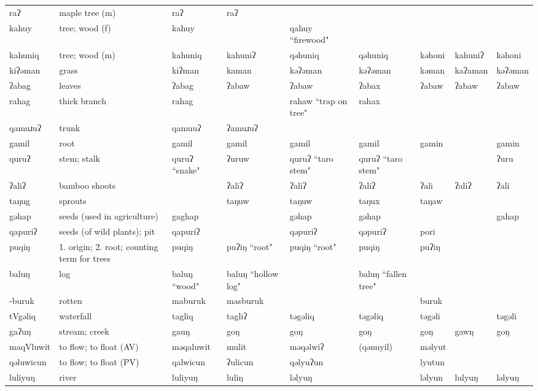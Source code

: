 \begin{landscape}
\begin{longtable}{*{9}{p{}}}
\text{*}raʔ & maple tree (m) & raʔ & raʔ &  &  &  &  & \\
\text{*}kahuy & tree; wood (f) & kahuy &  & qahuy ``firewood" &  &  &  & \\
\text{*}kahuniq & tree; wood (m) & kahuniq & kahuniʔ & qəhuniq & qəhuniq & kəhoni & kahuniʔ & kəhoni\\
\text{*}kiʔəman & grass & kiʔman & kaman & kəʔəman & kəʔəman & kəman & kaʔaman & kəʔəman\\
\text{*}ʔabag & leaves & ʔabag & ʔabaw & ʔabaw & ʔabax & ʔabaw & ʔabaw & ʔabaw\\
\text{*}rahag & thick branch & rahag &  & rahaw ``trap on tree" & rahax &  &  & \\
\text{*}qamuɹuʔ & trunk & qamuuʔ & ʔamuɹuʔ &  &  &  &  & \\
\text{*}gamil & root & gamil & gamil & gamil & gamil & gamin &  & gamin\\
\text{*}quruʔ & stem; stalk & quruʔ ``snake" & ʔuruw & quruʔ ``taro stem" & quruʔ ``taro stem" &  &  & ʔuru\\
\text{*}ʔaliʔ & bamboo shoots &  & ʔaliʔ & ʔaliʔ & ʔaliʔ & ʔali & ʔaliʔ & ʔali\\
\text{*}taŋug & sprouts &  & taŋuw & taŋuw & taŋux & taŋaw &  & \\
\text{*}gəhap & seeds (used in agriculture) & gaghap &  & gəhap & gəhap &  &  & gahap\\
\text{*}qapuriʔ & seeds (of wild plants); pit & qapuriʔ &  & qəpuriʔ & qəpuriʔ & pori &  & \\
\text{*}puqiŋ & 1. origin; 2. root; counting term for trees & puqiŋ & puʔiŋ ``root" & puqiŋ ``root" & puqiŋ & puʔiŋ &  & \\
\text{*}baluŋ & log & baluŋ ``wood" & baluŋ ``hollow log" &  & baluŋ ``fallen tree" &  &  & \\
\text{*}-buruk & rotten & maburuk & masburuk &  &  & buruk &  & \\
\text{*}tVgəliq & waterfall & tagliq & tagliʔ & təgəliq & təgəliq & təgəli &  & təgəli\\
\text{*}gaʔuŋ & stream; creek & gauŋ & goŋ & goŋ & goŋ & goŋ & gawŋ & goŋ\\
\text{*}maqVluwit & to flow; to float (AV) & məqaluwit & mulit & məqəlwiʔ & (qənuyil) & məlyut &  & \\
\text{*}qəluwicun & to flow; to float (PV) & qalwicun & ʔulicun & qəlyuʔun &  & lyutun &  & \\
\text{*}luliyuŋ & river & luliyuŋ & luliŋ & ləlyuŋ &  & ləlyun & lulyuŋ & ləlyuŋ\\

\end{longtable}
\end{landscape}
